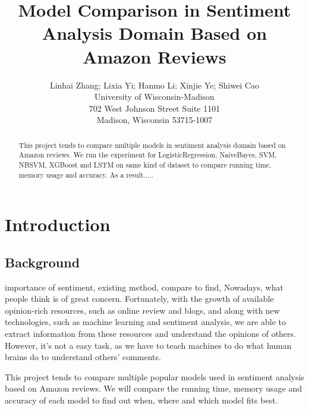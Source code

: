 \documentclass[letterpaper]{article} %
\begin{document}
%
\title{Model Comparison in Sentiment Analysis Domain Based on Amazon Reviews}
\author{Linhai Zhang; Lixia Yi; Hanmo Li; Xinjie Ye; Shiwei Cao\\
University of Wisconsin-Madison\\
702 West Johnson Street Suite 1101\\
Madison, Wisconsin 53715-1007\\
}
\maketitle
\begin{abstract}
This project tends to compare multiple models in sentiment analysis domain based on Amazon reviews. We run the experiment for LogisticRegression, NaiveBayes, SVM, NBSVM, XGBoost and LSTM on same kind of dataset to compare running time, memory usage and accuracy. As a result.....

\end{abstract}
\section{Introduction}
\subsection{Background}
importance of sentiment, existing method, compare to find, 
Nowadays, what people think is of great concern. Fortunately, with the growth of available opinion-rich resources, such as online review and blogs, and along with new technologies, such as machine learning and sentiment analysis, we are able to extract information from these resources and understand the opinions of others. However, it's not a easy task, as we have to teach machines to do what human brains do to understand others' comments.

This project tends to compare multiple popular models used in sentiment analysis based on Amazon reviews. We will compare the running time, memory usage and accuracy of each model to find out when, where and which model fits best. 
\end{document}
